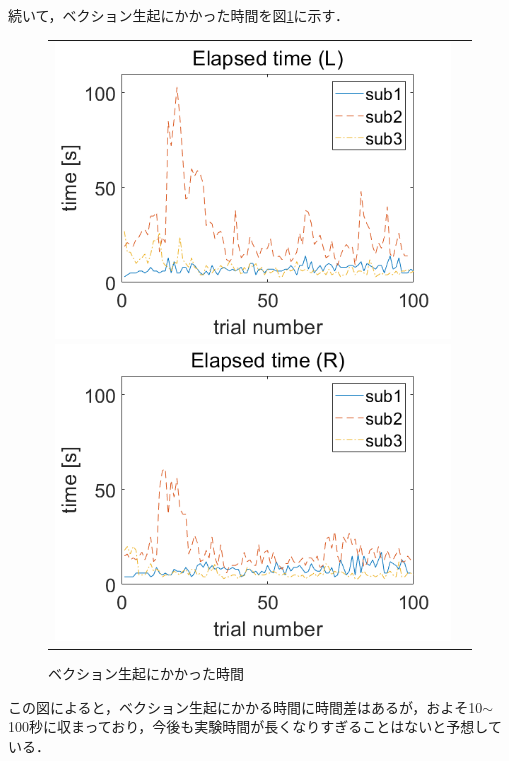 \documentclass[12pt,a4j]{jsarticle}
\renewcommand{\ }{\hspace{1zw}}
\begin{document}
\ 続いて，ベクション生起にかかった時間を図\ref{vt}に示す．
\begin{figure}
    \begin{tabular}{cc}
        \begin{minipage}{0.5 \columnwidth}
            \includegraphics[width=\columnwidth]{./figure/allVT_L.png}
        \end{minipage}
        \begin{minipage}{0.5 \columnwidth}
            \includegraphics[width=\columnwidth]{./figure/allVT_R.png}
        \end{minipage}
    \end{tabular}
    \caption{ベクション生起にかかった時間}
    \label{vt}
\end{figure}
この図によると，ベクション生起にかかる時間に時間差はあるが，およそ10$\sim$100秒に収まっており，今後も実験時間が長くなりすぎることはないと予想している．
\end{document}
